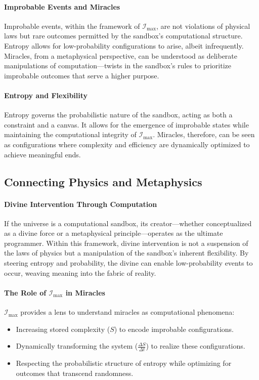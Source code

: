 \documentclass[12pt]{article}
\begin{document}
\paragraph{Improbable Events and Miracles}
Improbable events, within the framework of \(\mathcal{I}_{\text{max}}\), are not violations of physical laws but rare outcomes permitted by the sandbox's computational structure. Entropy allows for low-probability configurations to arise, albeit infrequently. Miracles, from a metaphysical perspective, can be understood as deliberate manipulations of computation—twists in the sandbox's rules to prioritize improbable outcomes that serve a higher purpose.

\paragraph{Entropy and Flexibility}
Entropy governs the probabilistic nature of the sandbox, acting as both a constraint and a canvas. It allows for the emergence of improbable states while maintaining the computational integrity of \(\mathcal{I}_{\text{max}}\). Miracles, therefore, can be seen as configurations where complexity and efficiency are dynamically optimized to achieve meaningful ends.

\subsection{Connecting Physics and Metaphysics}

\paragraph{Divine Intervention Through Computation}
If the universe is a computational sandbox, its creator—whether conceptualized as a divine force or a metaphysical principle—operates as the ultimate programmer. Within this framework, divine intervention is not a suspension of the laws of physics but a manipulation of the sandbox's inherent flexibility. By steering entropy and probability, the divine can enable low-probability events to occur, weaving meaning into the fabric of reality.

\paragraph{The Role of \(\mathcal{I}_{\text{max}}\) in Miracles}
\(\mathcal{I}_{\text{max}}\) provides a lens to understand miracles as computational phenomena:
\begin{itemize}
    \item Increasing stored complexity (\(S\)) to encode improbable configurations.
    \item Dynamically transforming the system (\(\frac{\Delta S}{\Delta t}\)) to realize these configurations.
    \item Respecting the probabilistic structure of entropy while optimizing for outcomes that transcend randomness.
\end{itemize}
\end{document}
